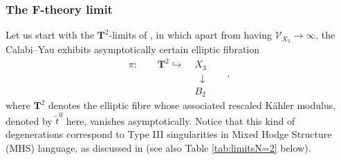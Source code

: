 \subsubsection*{The F-theory limit}
\label{sss:IIA-Ftheorylimit}		
Let us start with the $\mathbf{T}^2$-limits of \cite{Lee:2019wij}, in which apart from having $\mathcal{V}_{X_3}\to \infty$, %
the Calabi--Yau exhibits asymptotically certain elliptic fibration
%
\begin{equation}
			\begin{aligned}\label{eq:ellipticcaseEmergence}
				\pi: \qquad \mathbf{T}^2 \hookrightarrow &\;X_{3} \\
				&\;\; \downarrow \qquad , \\ &\;B_{2}
			\end{aligned}
\end{equation}
%
where $\mathbf{T}^2$ denotes the elliptic fibre whose associated rescaled K\"ahler modulus, denoted by $\tilde{t}^0$ here, vanishes asymptotically. Notice that this kind of degenerations correspond to Type III singularities in Mixed Hodge Structure (MHS) language, as discussed in \cite{Grimm:2018ohb, Corvilain:2018lgw} (see also Table \ref{tab:limitsN=2} below).
		
